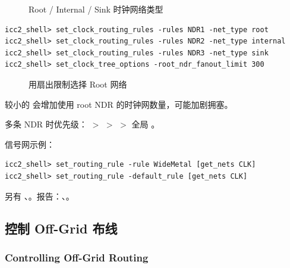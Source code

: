 \begin{figure}[htbp]
\centering
{}
\caption{Root / Internal / Sink 时钟网络类型}
\label{fig:clock-net-types}
\end{figure}

\begin{lstlisting}
icc2_shell> set_clock_routing_rules -rules NDR1 -net_type root
icc2_shell> set_clock_routing_rules -rules NDR2 -net_type internal
icc2_shell> set_clock_routing_rules -rules NDR3 -net_type sink
icc2_shell> set_clock_tree_options -root_ndr_fanout_limit 300
\end{lstlisting}

\begin{figure}[htbp]
\centering
{}
\caption{用扇出限制选择 Root 网络}
\label{fig:root-fanout-limit}
\end{figure}

\begin{noteBox}
较小的  会增加使用 root NDR 的时钟网数量，可能加剧拥塞。
\end{noteBox}

多条 NDR 时优先级： $>$  $>$  $>$ 全局 。

信号网示例：
\begin{lstlisting}
icc2_shell> set_routing_rule -rule WideMetal [get_nets CLK]
icc2_shell> set_routing_rule -default_rule [get_nets CLK]
\end{lstlisting}
另有 、。报告：、。

\subsection{控制 Off-Grid 布线}
\subsubsection*{Controlling Off-Grid Routing}

